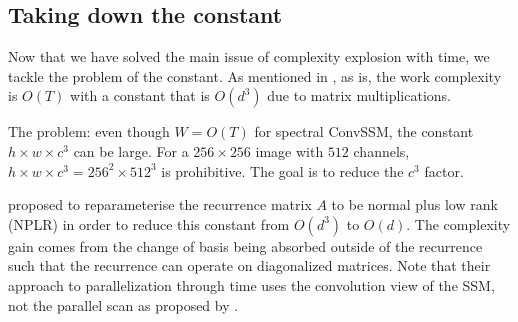 

\subsection{Taking down the constant}
\label{sec:the_constant}

Now that we have solved the main issue of complexity explosion with time, we tackle the problem of the constant. As mentioned in , as is, the work complexity is $O(T)$ with a constant that is $O(d^3)$ due to matrix multiplications.

\begin{ThomasAnnotation}
The problem: even though $W = O(T)$ for spectral ConvSSM, the constant $h \times w \times c^3$ can be large. For a $256 \times 256$ image with $512$ channels, $h \times w \times c^3 = 256^2 \times 512^3$ is prohibitive. The goal is to reduce the $c^3$ factor.
\end{ThomasAnnotation}

\citet{TODO:S4SSM} proposed to reparameterise the recurrence matrix $A$ to be normal plus low rank (NPLR) in order to reduce this constant from $O(d^3)$ to $O(d)$. The complexity gain comes from the change of basis being absorbed outside of the recurrence such that the recurrence can operate on diagonalized matrices. Note that their approach to parallelization through time uses the convolution view of the SSM, not the parallel scan as proposed by \citet{TODO:S5SSM}.

